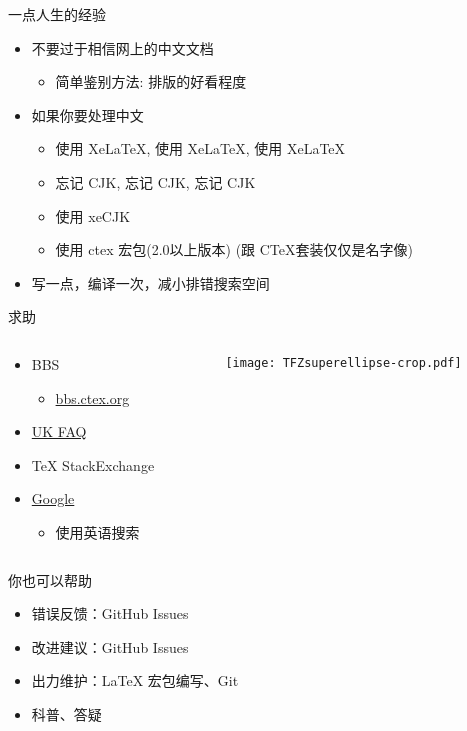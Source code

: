 \begin{frame}{一点人生的经验}
  \begin{itemize}
    \item 不要过于相信网上的中文文档
      \begin{itemize}
        \item 简单鉴别方法: 排版的好看程度
      \end{itemize}
    \item 如果你要处理中文
      \begin{itemize}
        \item 使用 XeLaTeX, 使用 XeLaTeX, 使用 XeLaTeX
        \item 忘记 CJK, 忘记 CJK, 忘记 CJK
        \item 使用 xeCJK
        \item 使用 ctex 宏包(2.0以上版本) (跟 C\TeX 套装仅仅是名字像)
      \end{itemize}
    \item 写一点，编译一次，减小排错搜索空间
  \end{itemize} 
\end{frame}

\begin{frame}{求助}
  \begin{columns}[c]
    \begin{column}{.45\textwidth}
      \begin{itemize}
        \item BBS
          \begin{itemize}
            \item \href{http://bbs.ctex.org/}{bbs.ctex.org}
          \end{itemize}
        \item \href{http://www.tex.ac.uk/cgi-bin/texfaq2html}{UK FAQ}
        \item TeX StackExchange
        \item \href{http://justfuckinggoogleit.com/}{Google}
          \begin{itemize}
            \item 使用英语搜索
          \end{itemize}
      \end{itemize}
    \end{column}
    \begin{column}{.45\textwidth}
      \texttt{[image: TFZsuperellipse-crop.pdf]}
    \end{column}
  \end{columns}
\end{frame}

\begin{frame}{你也可以帮助}
  \begin{itemize}
    \item 错误反馈：GitHub Issues
    \item 改进建议：GitHub Issues
    \item 出力维护：LaTeX 宏包编写、Git
    \item 科普、答疑%
  \end{itemize}
\end{frame}

